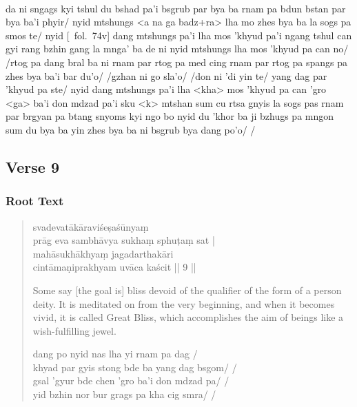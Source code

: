\documentclass[12pt]{article}
\begin{document}
\textbf{\TVB}\\
da ni sngags kyi tshul du bshad pa'i bsgrub par bya ba rnam pa bdun bstan par bya ba'i phyir/ nyid mtshungs <a na ga badz+ra> lha mo zhes bya ba la sogs pa smos te/ nyid [\TVB\ fol.\ 74v] dang mtshungs pa'i lha mos 'khyud pa'i ngang tshul can gyi rang bzhin gang la mnga' ba de ni nyid mtshungs lha mos 'khyud pa can no/ /rtog pa dang bral ba ni rnam par rtog pa med cing rnam par rtog pa spangs pa zhes bya ba'i bar du'o/ /gzhan ni go sla'o/ /don ni 'di yin te/ yang dag par 'khyud pa ste/ nyid dang mtshungs pa'i lha <kha> mos 'khyud pa can 'gro <ga> ba'i don mdzad pa'i sku <k> mtshan sum cu rtsa gnyis la sogs pas rnam par brgyan pa btang snyoms kyi ngo bo nyid du 'khor ba ji bzhugs pa mngon sum du bya ba yin zhes bya ba ni bsgrub bya dang po'o/ /

\subsection{Verse 9}
\subsubsection{Root Text}
\begin{quote}
	svadevatākāraviśeṣaśūnyaṃ \\
	prāg eva sambhāvya sukhaṃ sphuṭaṃ sat |\\
	mahāsukhākhyaṃ jagadarthakāri \\
	cintāmaṇiprakhyam uvāca kaścit || 9 ||

	Some say [the goal is] bliss devoid of the qualifier of the form of a person deity. It is meditated on from the very beginning, and when it becomes vivid, it is called Great Bliss, which accomplishes the aim of beings like a wish-fulfilling jewel.

	dang po nyid nas lha yi rnam pa dag /\\
	khyad par gyis stong bde ba yang dag bsgom/ /\\
	gsal 'gyur bde chen 'gro ba'i don mdzad pa/ /\\
	yid bzhin nor bur grags pa kha cig smra/ /
\end{quote}
\end{document}
